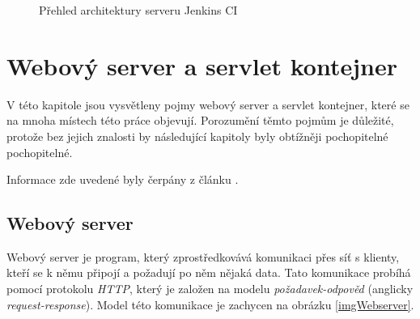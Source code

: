             \begin{figure}[ht]
                \begin{center}
                    \caption{Přehled architektury serveru Jenkins CI \cite{architectureOverview}}
                    \label{imgJenkinsArchitecture}
                \end{center}
            \end{figure}     

    \section{Webový server a servlet kontejner} \label{servletWebserver}
        V této kapitole jsou vysvětleny pojmy webový server a servlet kontejner, které se 
        na mnoha místech této práce objevují. Porozumění těmto pojmům je důležité, protože bez
        jejich znalosti by následující kapitoly byly obtížněji pochopitelné pochopitelné.
        
        Informace zde uvedené byly čerpány z článku \cite{webserverVsServletPage}.

        \subsection{Webový server}
            Webový server je program, který zprostředkovává komunikaci přes síť s klienty, kteří
            se k němu připojí a požadují po něm nějaká data. Tato komunikace probíhá pomocí protokolu \emph{HTTP}, 
            který je založen na modelu \emph{požadavek-odpověd} (anglicky \emph{request-response}).
            Model této komunikace je zachycen na obrázku \ref{imgWebserver}.
            
